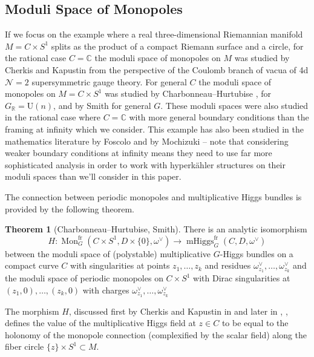 \documentclass[11pt, oneside, reqno]{amsart}
\theoremstyle{definition} \newtheorem{definition}{Definition}[section]
\newtheorem{theorem}[definition]{Theorem}
\theoremstyle{definition} \newtheorem{remark}[definition]{Remark}
\theoremstyle{definition} \newtheorem{remarks}[definition]{Remarks}
\theoremstyle{definition} \newtheorem{question}[definition]{Question}
\theoremstyle{definition} \newtheorem*{note}{Note}
\theoremstyle{definition} \newtheorem{example}[definition]{Example}
\theoremstyle{definition} \newtheorem{examples}[definition]{Examples}
\newcommand{\mr}[1]{\mathrm{#1}}
\newcommand{\CC}{\mathbb{C}}
\newcommand{\RR}{\mathbb{R}}
\DeclareMathOperator{\mhiggs}{mHiggs}
\DeclareMathOperator{\mon}{Mon}
\newcommand{\fr}{\mathrm{fr}}
\begin{document}
\subsection{Moduli Space of Monopoles}

If we focus on the example where a real three-dimensional Riemannian
manifold $M = C \times S^1$ splits as the product of a compact Riemann
surface and a circle, for the rational case $C = \CC$ the moduli space
of monopoles on $M$ was studied by Cherkis and Kapustin
\cite{CherkisKapustin1,CherkisKapustin2,CherkisKapustin3} from the
perspective of the Coulomb branch of vacua of 4d $\mathcal{N}=2$
supersymmetric gauge theory. For general $C$ the moduli space of
monopoles on $M = C \times S^{1}$ was studied by
Charbonneau--Hurtubise \cite{CharbonneauHurtubise}, for
$G_\RR = \mr U(n)$, and by Smith \cite{Smith} for general $G$.  These
moduli spaces were also studied in the rational case where $C = \CC$
with more general boundary conditions than the framing at infinity
which we consider.  This example has also been studied in the
mathematics literature by Foscolo \cite{FoscoloDef, FoscoloThesis} and
by Mochizuki \cite{Mochizuki} -- note that considering weaker boundary
conditions at infinity means they need to use far more sophisticated
analysis in order to work with hyperk\"ahler structures on their
moduli spaces than we'll consider in this paper.

The connection between periodic monopoles and multiplicative Higgs bundles is provided by the following theorem.
\begin{theorem}[Charbonneau--Hurtubise, Smith]
  There is an analytic isomorphism 
  \begin{equation*}
    H: \mon_G^\fr(C \times S^1,D \times\{0\},\omega^\vee) \to \mhiggs_G^{\text{fr}}(C,D,\omega^\vee)
  \end{equation*}
between the moduli space of (polystable) multiplicative $G$-Higgs bundles on a compact curve $C$ with singularities at points $z_1, \ldots, z_k$ and residues $\omega^\vee_{z_1}, \ldots, \omega^\vee_{z_k}$ and the moduli space of periodic monopoles on $C \times S^1$ with Dirac singularities at $(z_1,0), \ldots, (z_k,0)$ with charges $\omega^\vee_{z_1}, \ldots, \omega^\vee_{z_k}$
\end{theorem}

The morphism $H$,  discussed first by Cherkis and Kapustin in \cite{CherkisKapustin2} and later in
\cite{CharbonneauHurtubise}, \cite{Smith}, \cite{NekrasovPestun}
defines the value of the multiplicative Higgs field at $z \in C$ to be equal to
the holonomy of the monopole connection (complexified by the scalar field) along the fiber circle $\{z\} \times S^{1} \subset M$.
\end{document}
